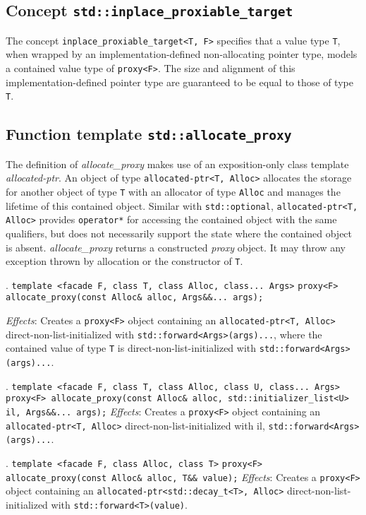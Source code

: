 \documentclass[10pt, a4paper, oneside]{article}
\begin{document}
\subsection{Concept \texttt{std::inplace\_proxiable\_target}}
The concept \verb|inplace_proxiable_target<T, F>| specifies that a value type \verb|T|,
when wrapped by an \linebreak implementation-defined non-allocating pointer type,
models a contained value type of \verb|proxy<F>|.
The size and alignment of this implementation-defined pointer type are guaranteed to be equal to those of type \verb|T|.

\subsection{Function template \texttt{std::allocate\_proxy}}
The definition of \textit{allocate\_proxy} makes use of an exposition-only class template \textit{allocated-ptr}.
An object of type \verb|allocated-ptr<T, Alloc>| allocates the storage for another object of type \verb|T| with an allocator of type \verb|Alloc| and manages the lifetime of this contained object.
Similar with \verb|std::optional|, \verb|allocated-ptr<T, Alloc>| provides \verb|operator*| for accessing the contained object with the same qualifiers,
but does not necessarily support the state where the contained object is absent.\smallbreak
\textit{allocate\_proxy} returns a constructed \textit{proxy} object. It may throw any exception thrown by allocation or the constructor of \verb|T|.
\medbreak

. \verb|template <facade F, class T, class Alloc, class... Args>|\smallbreak
\verb|proxy<F> allocate_proxy(const Alloc& alloc, Args&&... args);|

\textit{Effects}: Creates a \verb|proxy<F>| object containing an \verb|allocated-ptr<T, Alloc>| direct-non-list-initialized with \verb|std::forward<Args>(args)...|,
where the contained value of type \verb|T| is direct-non-list-initialized with \verb|std::forward<Args>(args)...|.
\medbreak

. \verb|template <facade F, class T, class Alloc, class U, class... Args>|\smallbreak
\verb|proxy<F> allocate_proxy(const Alloc& alloc, std::initializer_list<U> il, Args&&... args);|
\medbreak
\textit{Effects}: Creates a \verb|proxy<F>| object containing an \verb|allocated-ptr<T, Alloc>| direct-non-list-initialized with il, \verb|std::forward<Args>(args)...|.
\medbreak

. \verb|template <facade F, class Alloc, class T>|\smallbreak
\indent \verb|proxy<F> allocate_proxy(const Alloc& alloc, T&& value);|
\medbreak
\textit{Effects}: Creates a \verb|proxy<F>| object containing an \verb|allocated-ptr<std::decay_t<T>, Alloc>| direct-non-list-initialized with \verb|std::forward<T>(value)|.
\end{document}
